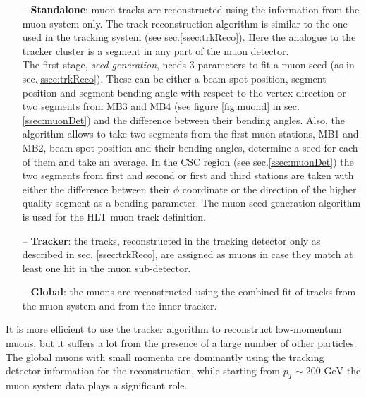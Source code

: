\begin{itemize}
 \item [--] \textbf{Standalone}: muon tracks are reconstructed using the information from the muon system only. The track reconstruction
 algorithm \cite{TWiki:GlobalMuon} is similar to the one used in the tracking system (see sec.\ref{ssec:trkReco}). Here the analogue to the
 tracker cluster is a segment in any part of the muon detector.
 \\
 The first stage, \textit{seed generation}, needs 3 parameters to fit a muon seed (as in sec.\ref{ssec:trkReco}). These can be either a beam spot position, segment position and segment
 bending angle with respect to the vertex direction or two segments from MB3 and MB4 (see figure \ref{fig:muond} in sec.\ref{ssec:muonDet}) and the difference
 between their bending angles. Also, the algorithm allows to take two segments from the first muon stations, MB1 and MB2, beam spot position and their
 bending angles, determine a seed for each of them and take an average. In the CSC region (see sec.\ref{ssec:muonDet}) the two segments from first and second
 or first and third stations are taken with either the difference between their $\phi$ coordinate or the direction of the higher quality segment as a bending parameter.
 The muon seed generation algorithm is used for the HLT muon track definition.
 
 
 \item [--] \textbf{Tracker}: the tracks, reconstructed in the tracking detector only as described in sec. \ref{ssec:trkReco}, 
 are assigned as muons in case they match at least one hit in the muon sub-detector. 
 
 \item [--] \textbf{Global}: the muons are reconstructed using 
 the combined fit of tracks from the muon system and from the inner tracker.
\end{itemize}

It is more efficient to use the tracker algorithm to reconstruct
low-momentum muons, but it suffers a lot from the presence of a large number of other particles. The global muons with small momenta
are dominantly using the tracking detector information for the reconstruction, while starting from $p_{T} \sim \textrm{200 GeV}$
the muon system data plays a significant role.
% 
% 
% 
% 

